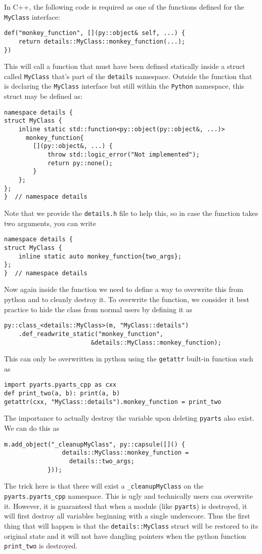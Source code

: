 In C++, the following code is required as one of the functions defined for the \verb|MyClass| interface:
\begin{verbatim}
def("monkey_function", [](py::object& self, ...) {
    return details::MyClass::monkey_function(...);
})
\end{verbatim}
This will call a function that must have been defined statically inside a struct called \verb|MyClass| that's part of the \verb|details| namespace.
Outside the function that is declaring the \verb|MyClass| interface but still within the \verb|Python| namespace, this struct may be defined as:
\begin{verbatim}
namespace details {
struct MyClass {
    inline static std::function<py::object(py::object&, ...)>
      monkey_function{
        [](py::object&, ...) {
            throw std::logic_error("Not implemented");
            return py::none();
        }
    };
};
}  // namespace details
\end{verbatim}
Note that we provide the \verb|details.h| file to help this, so in case the function takes two arguments, you can write
\begin{verbatim}
namespace details {
struct MyClass {
    inline static auto monkey_function{two_args};
};
}  // namespace details
\end{verbatim}
Now again inside the function we need to define a way to overwrite this from python and to cleanly destroy it.
To overwrite the function, we consider it best practice to hide the class from normal users by defining it as
\begin{verbatim}
py::class_<details::MyClass>(m, "MyClass::details")
    .def_readwrite_static("monkey_function",
                        &details::MyClass::monkey_function);
\end{verbatim}
This can only be overwritten in python using the \verb|getattr| built-in function such as
\begin{verbatim}
import pyarts.pyarts_cpp as cxx
def print_two(a, b): print(a, b)
getattr(cxx, "MyClass::details").monkey_function = print_two
\end{verbatim}
The importance to actually destroy the variable upon deleting \verb|pyarts| also exist.  We can do this as
\begin{verbatim}
m.add_object("_cleanupMyClass", py::capsule([]() {
                details::MyClass::monkey_function =
                  details::two_args;
            }));
\end{verbatim}
The trick here is that there will exist a \verb|_cleanupMyClass| on the \verb|pyarts.pyarts_cpp| namespace.
This is ugly and technically users can overwrite it.  However, it is guaranteed that when a module (like \verb|pyarts|)
is destroyed, it will first destroy all variables beginning with a single underscore.  Thus the first thing that will
happen is that the \verb|details::MyClass| struct will be restored to its original state and it will not have dangling
pointers when the python function \verb|print_two| is destroyed.

